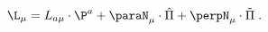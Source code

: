 \begin{equation}
\label{e4:9}
\L_{\mu}=L_{a \mu}\cdot \P^a + \paraN_{\mu} \cdot \hat{\Pi} + \perpN_{\mu} \cdot \tilde{\Pi} \; .
\end{equation}

